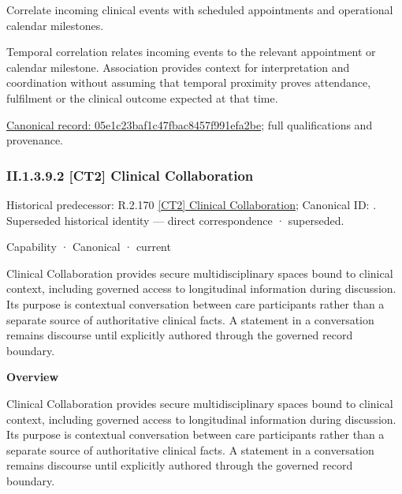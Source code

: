 Correlate incoming clinical events with scheduled appointments and operational calendar milestones.



Temporal correlation relates incoming events to the relevant appointment or calendar milestone. Association provides context for interpretation and coordination without assuming that temporal proximity proves attendance, fulfilment or the clinical outcome expected at that time.


{\footnotesize \href{../../../../continuum/strategy/capability/feature/05e1c23baf1c47fbac8457f991efa2be.md}{Canonical record: 05e1c23baf1c47fbac8457f991efa2be}; full qualifications and provenance.}\par
\subsubsection*{II.1.3.9.2 [CT2] Clinical Collaboration}
\label{navigation:II.1.3.9.2}

{\small Historical predecessor: R.2.170 \hyperref[element:c5adc1955b6046d8b920b0176cebc9de]{[CT2] Clinical Collaboration}; Canonical ID: \texttt{}. Superseded historical identity — direct correspondence · superseded.}\par
\label{element:e6429225463a44d39f82e490e254e5d4}
{\small Capability · Canonical · current}\par

Clinical Collaboration provides secure multidisciplinary spaces bound to clinical context, including governed access to longitudinal information during discussion. Its purpose is contextual conversation between care participants rather than a separate source of authoritative clinical facts. A statement in a conversation remains discourse until explicitly authored through the governed record boundary.



\textbf{Overview}



Clinical Collaboration provides secure multidisciplinary spaces bound to clinical context, including governed access to longitudinal information during discussion. Its purpose is contextual conversation between care participants rather than a separate source of authoritative clinical facts. A statement in a conversation remains discourse until explicitly authored through the governed record boundary.



